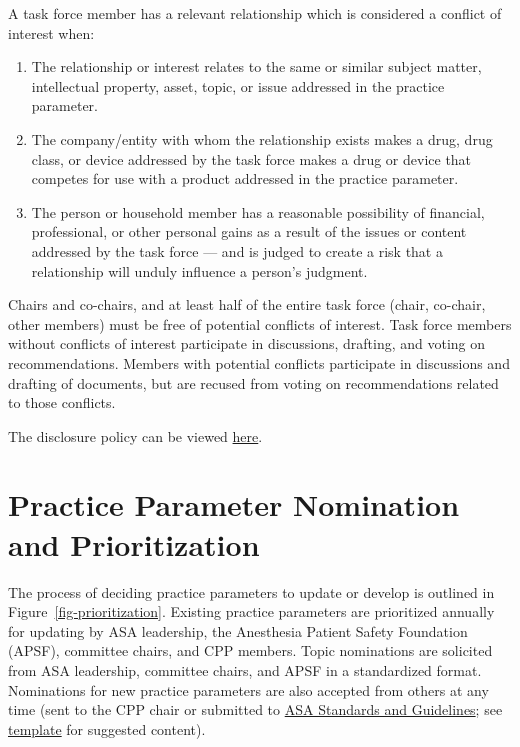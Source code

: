 \documentclass[
  letterpaper,
  DIV=11,
  numbers=noendperiod]{scrreprt}
\begin{document}
A task force member has a relevant relationship which is considered a
conflict of interest when:

\begin{enumerate}
\def\labelenumi{\arabic{enumi}.}
\item
  The relationship or interest relates to the same or similar subject
  matter, intellectual property, asset, topic, or issue addressed in the
  practice parameter.
\item
  The company/entity with whom the relationship exists makes a drug,
  drug class, or device addressed by the task force makes a drug or
  device that competes for use with a product addressed in the practice
  parameter.
\item
  The person or household member has a reasonable possibility of
  financial, professional, or other personal gains as a result of the
  issues or content addressed by the task force --- and is judged to
  create a risk that a relationship will unduly influence a person's
  judgment.
\end{enumerate}

Chairs and co-chairs, and at least half of the entire task force (chair,
co-chair, other members) must be free of potential conflicts of
interest. Task force members without conflicts of interest participate
in discussions, drafting, and voting on recommendations. Members with
potential conflicts participate in discussions and drafting of
documents, but are recused from voting on recommendations related to
those conflicts.

The disclosure policy can be viewed
\href{assets/CPP_Disclosure_Policy_2022-09-23.pdf}{here}.

\hypertarget{practice-parameter-nomination-and-prioritization}{%
\section{Practice Parameter Nomination and
Prioritization}\label{practice-parameter-nomination-and-prioritization}}

The process of deciding practice parameters to update or develop is
outlined in Figure~\ref{fig-prioritization}. Existing practice
parameters are prioritized annually for updating by ASA leadership, the
Anesthesia Patient Safety Foundation (APSF), committee chairs, and CPP
members. Topic nominations are solicited from ASA leadership, committee
chairs, and APSF in a standardized format. Nominations for new practice
parameters are also accepted from others at any time (sent to the CPP
chair or submitted to \href{mailto:Guidelines@asahq.org}{ASA Standards
and Guidelines}; see
\href{assets/Nomination_Template_2023-07-24.pdf}{template} for suggested
content).
\end{document}
